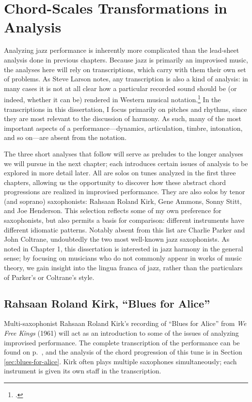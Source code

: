 \section{Chord-Scales Transformations in Analysis}
\label{sec:chord-scale-analysis}

Analyzing jazz performance is inherently more complicated than the
lead-sheet analysis done in previous chapters. Because jazz is primarily an
improvised music, the analyses here will rely on transcriptions, which carry
with them their own set of problems. As Steve Larson notes, any
transcription is also a kind of analysis: in many cases it is not at all clear
how a particular recorded sound should be (or indeed, whether it can be)
rendered in Western musical notation.\footcite[1--2]{larson:2009} In the
transcriptions in this dissertation, I focus primarily on pitches and rhythms,
since they are most relevant to the discussion of harmony. As such, many
of the most important aspects of a performance---dynamics, articulation,
timbre, intonation, and so on---are absent from the notation.

The three short analyses that follow will serve as preludes to the longer
analyses we will pursue in the next chapter; each introduces
certain issues of analysis to be explored in more detail later. All are
solos on tunes analyzed in the first three chapters, allowing us the
opportunity to discover how these abstract chord progressions are realized in
improvised performance. They are also solos by tenor (and soprano)
saxophonists: Rahsaan Roland Kirk, Gene Ammons, Sonny Stitt, and Joe
Henderson. This selection reflects some of my own preference for saxophonists,
but also permits a basis for comparison: different instruments have
different idiomatic patterns. Notably absent from this list are Charlie Parker
and John Coltrane, undoubtedly the two most well-known jazz saxophonists. As noted in
Chapter 1, this dissertation is interested in jazz harmony in the general
sense; by focusing on musicians who do not commonly appear in works of music
theory, we gain insight into the lingua franca of jazz, rather than the
particulars of Parker's or Coltrane's style.

\subsection{Rahsaan Roland Kirk, “Blues for Alice”}
\label{subsec:kirk-blues-for-alice}

Multi-saxophonist Rahsaan Roland Kirk's recording of ``Blues for Alice'' from
\emph{We Free Kings} (1961) will act as an introduction to some of the issues
of analyzing improvised performance. The complete transcription of the
performance can be found on p.~\pageref{transcription:blues-for-alice}, and
the analysis of the chord progression of this tune is in Section
\ref{sec:blues-for-alice}. Kirk often plays multiple saxophones
simultaneously; each instrument is given its own staff in the transcription.

